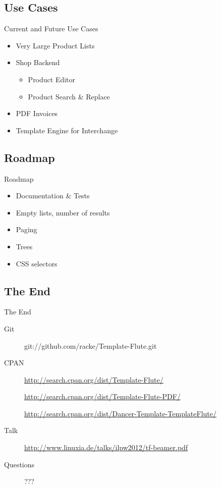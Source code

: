 \subsection{Use Cases}
\begin{frame}{Current and Future Use Cases}
  \begin{itemize}
  \item Very Large Product Lists
  \item Shop Backend
    \begin{itemize}
    \item Product Editor
    \item Product Search \& Replace
    \end{itemize}
  \item PDF Invoices
  \item Template Engine for Interchange
 \end{itemize}
\end{frame}

\subsection{Roadmap}
\begin{frame}{Roadmap}
 \begin{itemize}
   \item Documentation \& Tests
   \item Empty lists, number of results
   \item Paging
   \item Trees 
   \item CSS selectors
 \end{itemize}
\end{frame}

\subsection{The End}
\begin{frame}{The End}
 \begin{description}
  \item[Git] git://github.com/racke/Template-Flute.git
  \item[CPAN] \url{http://search.cpan.org/dist/Template-Flute/}
  \item[]   \url{http://search.cpan.org/dist/Template-Flute-PDF/}
  \item[]   \url{http://search.cpan.org/dist/Dancer-Template-TemplateFlute/}
  \item[Talk]
    \url{http://www.linuxia.de/talks/ilpw2012/tf-beamer.pdf}
   \item[Questions] ???
 \end{description}
\end{frame}




